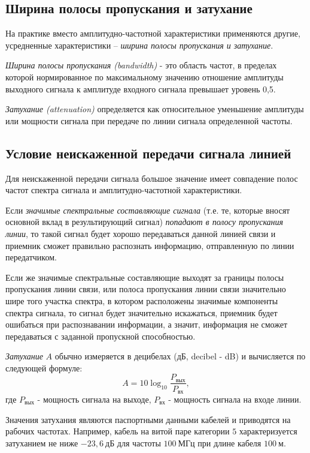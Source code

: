 \subsection{Ширина полосы пропускания и затухание}

На практике вместо амплитудно-частотной характеристики применяются другие, усредненные характеристики – \emph{ширина полосы пропускания и затухание}.

\emph{Ширина полосы пропускания (bandwidth)} - это область частот, в пределах которой нормированное по максимальному значению отношение амплитуды выходного сигнала к амплитуде входного сигнала превышает уровень 0,5.

\emph{Затухание (attenuation)} определяется как относительное уменьшение амплитуды или мощности сигнала при передаче по линии сигнала определенной частоты.

\subsection{Условие неискаженной передачи сигнала линией}

Для неискаженной передачи сигнала большое значение имеет совпадение полос частот спектра сигнала и амплитудно-частотной характеристики.

Если \emph{значимые спектральные составляющие сигнала} (т.е. те, которые вносят основной вклад в результирующий сигнал) \emph{попадают в полосу пропускания линии}, то такой сигнал будет хорошо передаваться данной линией связи и приемник сможет правильно распознать информацию, отправленную по линии передатчиком.

Если же значимые спектральные составляющие выходят за границы полосы пропускания линии связи, или полоса пропускания линии связи значительно шире того участка спектра, в котором расположены значимые компоненты спектра сигнала, то сигнал будет значительно искажаться, приемник будет ошибаться при распознавании информации, а значит, информация не сможет передаваться с заданной пропускной способностью.

\emph{Затухание} $A$ обычно измеряется в децибелах (дБ, decibel - dB) и вычисляется по следующей формуле:
\[
    A = 10 \log_{10} \frac{P_\text{вых}}{P_\text{вх}},
\]
где $P_\text{вых}$ - мощность сигнала на выходе, $P_\text{вх}$ - мощность сигнала на входе линии.

Значения затухания являются паспортными данными кабелей и приводятся на рабочих частотах.
Например, кабель на витой паре категории $5$ характеризуется затуханием не ниже $-23,6~дБ$ для частоты $100~МГц$ при длине кабеля $100~м$.

